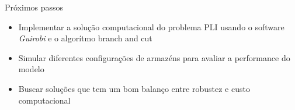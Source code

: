 \begin{frame}{Próximos passos}
    \begin{itemize}
        \item Implementar a solução computacional do problema PLI usando o software \textit{Guirobi} e o algorítmo branch and cut
        
        \item Simular diferentes configurações de armazéns para avaliar a performance do modelo
        \item Buscar soluções que tem um bom balanço entre robustez e custo computacional
    \end{itemize}
\end{frame}
